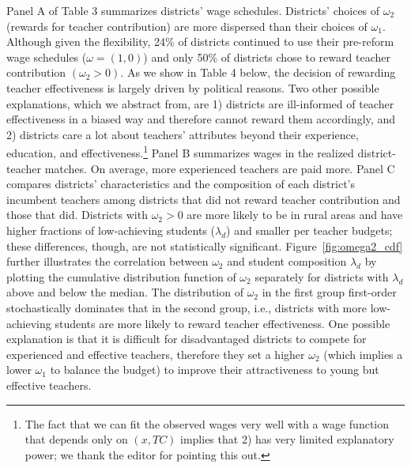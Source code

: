\documentclass[notitlepage,12pt]{article}%
\begin{document}
Panel A of Table 3 summarizes districts' wage schedules. Districts' choices of
$\omega_{2}$ (rewards for teacher contribution) are more dispersed than their
choices of $\omega_{1}$. Although given the flexibility, 24\% of districts
continued to use their pre-reform wage schedules ($\omega=\left(  1,0\right)
$) and only 50\% of districts chose to reward teacher contribution $\left(
\omega_{2}>0\right)  $. As we show in Table 4 below, the decision of rewarding
teacher effectiveness is largely driven by political reasons. Two other
possible explanations, which we abstract from, are 1) districts are
ill-informed of teacher effectiveness in a biased way and therefore cannot
reward them accordingly, and 2) districts care a lot about teachers'
attributes beyond their experience, education, and effectiveness.\footnote{The
fact that we can fit the observed wages very well with a wage function that
depends only on $\left(  x,TC\right)  $ implies that 2) has very limited
explanatory power; we thank the editor for pointing this out.} Panel B
summarizes wages in the realized district-teacher matches. On average, more
experienced teachers are paid more. Panel C compares districts'
characteristics and the composition of each district's incumbent teachers
among districts that did not reward teacher contribution and those that did.
Districts with $\omega_{2}>0$ are more likely to be in rural areas and have
higher fractions of low-achieving students ($\lambda_{d}$) and smaller per
teacher budgets; these differences, though, are not statistically significant.
Figure~\ref{fig:omega2_cdf} further illustrates the correlation between
$\omega_{2}$ and student composition $\lambda_{d}$ by plotting the cumulative
distribution function of $\omega_{2}$ separately for districts with
$\lambda_{d}$ above and below the median. The distribution of $\omega_{2}$ in
the first group first-order stochastically dominates that in the second group,
i.e., districts with more low-achieving students are more likely to reward
teacher effectiveness. One possible explanation is that it is difficult for
disadvantaged districts to compete for experienced and effective teachers,
therefore they set a higher $\omega_{2}$ (which implies a lower $\omega_{1}$
to balance the budget) to improve their attractiveness to young but effective teachers.
\end{document}
